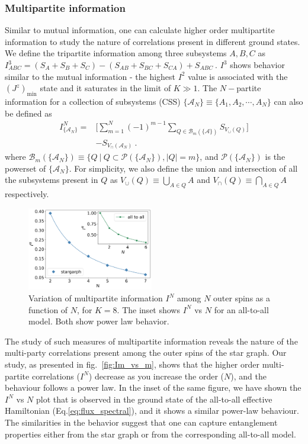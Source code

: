 \documentclass{iopart}
\begin{document}
\subsubsection{Multipartite information}
Similar to mutual information, one can calculate higher order multipartite information to study the nature of correlations present in different ground states. We define the tripartite information among three subsystems $A,B,C$ as $I^3_{ABC} = (S_A+S_B+S_C)-(S_{AB}+S_{BC}+S_{CA})+S_{ABC}~$. \(I^3\) shows behavior similar to the mutual information - the highest \(I^2\) value is associated with the $\left(J^z\right)_\mathrm{min}$ state and it saturates in the limit of $K\gg 1$. The $N-$partite information for a collection of subsystems (CSS) $\{\mathcal{A}_N\}\equiv\{A_1,A_2,\cdots,A_N\}$ can also be defined 
as~\cite{siddharthatee} 
\begin{eqnarray}
	I^{N}_{\{\mathcal{A}_N\}} = &\bigg[\displaystyle\sum_{m=1}^{N} (-1)^{m-1} \displaystyle\sum_{Q \in \mathcal{B}_m(\{\mathcal{A}\})} S_{V_{\cup}({Q})} \bigg] \nonumber\\
				    &- S_{V_{\cap}(\mathcal{A}_N)}~.
\label{eq:I_N_definition}
\end{eqnarray}
where  $\mathcal{B}_m(\{\mathcal{A}_N\})\equiv \{ Q~| ~Q\subset \mathcal{P}(\{\mathcal{A}_{N}\}), |Q|=m \}$, and $\mathcal{P}(\{\mathcal{A}_{N}\})$ is the powerset of $\{\mathcal{A}_N\}$. For simplicity, we also define the union and intersection of all the subsystems present in $Q$ as ${V}_{\cup}({Q})\equiv \bigcup_{A\in Q} A$ and ${V}_{\cap}({Q})\equiv \bigcap_{A\in Q} A$ respectively.
\begin{figure}
\includegraphics[width=0.49\textwidth]{2022INvsNK8.png}
\caption{Variation of multipartite information $I^N$ among \(N\) outer spins as a function of $N$, for $K=8$. The inset shows $I^N$ vs $N$ for an all-to-all model. Both show power law behavior.}
\label{fig:Im_vs_m}
\end{figure}

The study of such measures of multipartite information reveals the nature of the multi-party correlations present among the outer spins of the star graph. Our study, as presented in fig.~\eqref{fig:Im_vs_m}, shows that the higher order multi-partite correlations ($I^N$) decrease as you increase the order ($N$), and the behaviour follows a power law. In the inset of the same figure, we have shown the $I^N$ vs $N$ plot that is observed in the ground state of the all-to-all effective Hamiltonian (Eq.\ref{eq:flux_spectral}), and it shows a similar power-law behaviour. The similarities in the behavior suggest that one can capture entanglement properties either from the star graph or from the corresponding all-to-all model.
\end{document}
